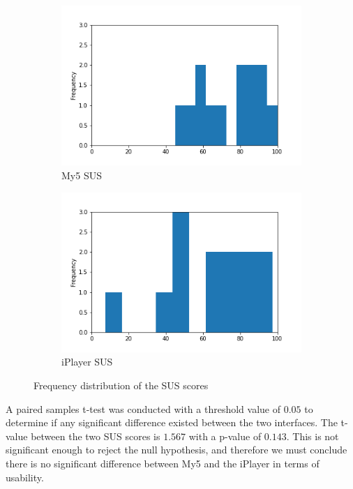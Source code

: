 \documentclass[12pt,a4paper,x11names]{article}
\begin{document}
\begin{figure}
\centering
\begin{subfigure}[b]{0.45\linewidth}
\centering
\includegraphics[width=\textwidth]{plots/my5-sus.png}
\caption{My5 SUS}
\end{subfigure}
\hfill
\begin{subfigure}[b]{0.45\linewidth}
\centering
\includegraphics[width=\textwidth]{plots/iplayer-sus.png}
\caption{iPlayer SUS}
\end{subfigure}
\caption{Frequency distribution of the SUS scores}
\end{figure}

A paired samples t-test was conducted with a threshold value of $0.05$ to determine if any significant difference existed between the two interfaces. The t-value between the two SUS scores is $1.567$ with a p-value of $0.143$. This is not significant enough to reject the null hypothesis, and therefore we must conclude there is no significant difference between My5 and the iPlayer in terms of usability.
\end{document}
